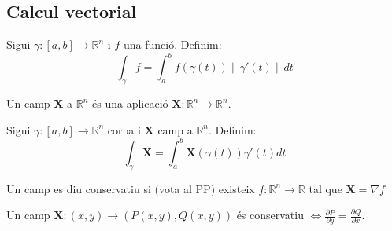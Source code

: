 \documentclass[../main.tex]{subfiles}
\begin{document}
    \subsection{Calcul vectorial}
    \begin{definicio}
        Sigui $\gamma: [a, b] \to \mathbb{R}^n$ i $f$ una funció. Definim:
        \begin{displaymath}
            \int_\gamma f = \int_{a}^{b} f(\gamma(t)) \left\lVert \gamma'(t)\right\rVert dt
        \end{displaymath}
    \end{definicio}
    \begin{definicio}
        Un camp $\mathbf{X}$ a $\mathbb{R}^n$ és una aplicació $\mathbf{X}: \mathbb{R}^n \to \mathbb{R}^n$.
    \end{definicio}
    \begin{definicio}
        Sigui $\gamma: [a, b] \to \mathbb{R}^n$ corba i $\mathbf{X}$ camp a $\mathbb{R}^n$. Definim:
        \begin{displaymath}
            \int_\gamma \mathbf{X} = \int_{a}^{b} \mathbf{X}(\gamma(t)) \gamma'(t) dt
        \end{displaymath}
    \end{definicio}
    \begin{definicio}
        Un camp es diu conservatiu si (vota al PP) existeix $f: \mathbb{R}^n \to \mathbb{R}$ tal que
        $\mathbf{X} = \nabla f$
    \end{definicio}
    \begin{teorema}
        Un camp $\mathbf{X}: (x,y) \to (P(x,y), Q(x,y))$ és conservatiu $\Leftrightarrow \frac{\partial P}{\partial y} = \frac{\partial Q}{\partial x}$.
    \end{teorema}
\end{document}
